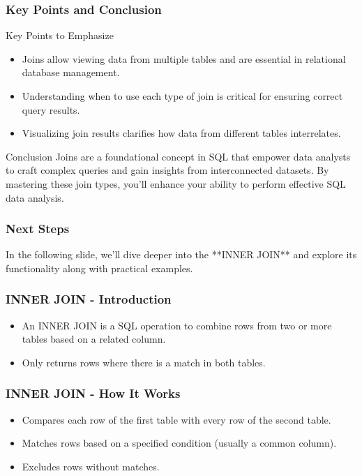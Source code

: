 \documentclass[aspectratio=169]{beamer}
\begin{document}
\begin{frame}[fragile]
    \frametitle{Key Points and Conclusion}

    \begin{block}{Key Points to Emphasize}
        \begin{itemize}
            \item Joins allow viewing data from multiple tables and are essential in relational database management.
            \item Understanding when to use each type of join is critical for ensuring correct query results.
            \item Visualizing join results clarifies how data from different tables interrelates.
        \end{itemize}
    \end{block}

    \begin{block}{Conclusion}
        Joins are a foundational concept in SQL that empower data analysts to craft complex queries and gain insights from interconnected datasets. 
        By mastering these join types, you'll enhance your ability to perform effective SQL data analysis.
    \end{block}
\end{frame}

\begin{frame}[fragile]
    \frametitle{Next Steps}
    In the following slide, we'll dive deeper into the **INNER JOIN** and explore its functionality along with practical examples.
\end{frame}

\begin{frame}[fragile]
    \frametitle{INNER JOIN - Introduction}
    \begin{itemize}
        \item An INNER JOIN is a SQL operation to combine rows from two or more tables based on a related column.
        \item Only returns rows where there is a match in both tables.
    \end{itemize}
\end{frame}

\begin{frame}[fragile]
    \frametitle{INNER JOIN - How It Works}
    \begin{itemize}
        \item Compares each row of the first table with every row of the second table.
        \item Matches rows based on a specified condition (usually a common column).
        \item Excludes rows without matches.
    \end{itemize}
\end{frame}
\end{document}
